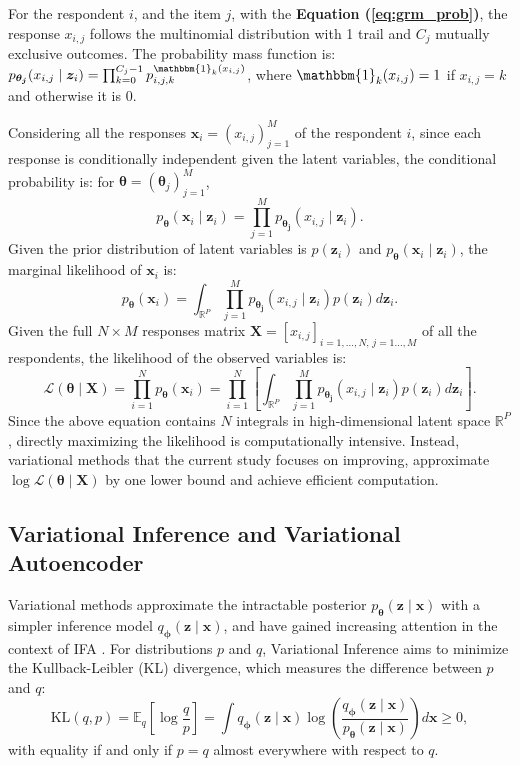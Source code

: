 \documentclass[a4paper,12pt]{article}
\theoremstyle{plain} %
\theoremstyle{remark} %
\theoremstyle{definition} %
\begin{document}
For the respondent $i$, and the item $j$, with the \textbf{Equation (\ref{eq:grm_prob})}, the response $x_{i,j}$ follows the multinomial distribution with 1 trail and $C_j$ mutually exclusive outcomes. The probability mass function is: $p_{\bm{\theta_j}}(x_{i,j} \mid \bm{z}_i)=\prod_{k=0}^{C_j-1}p_{i,j,k}^{\mathbbm{1}_k(x_{i,j})}$, where $\mathbbm{1}_k(x_{i,j})=1$ if $x_{i,j}=k$ and otherwise it is 0.

Considering all the responses $\bm{x}_i=(x_{i,j})_{j=1}^M$ of the respondent $i$, since each response is conditionally independent given the latent variables, the conditional probability is: for $\bm{\theta}=(\bm{\theta}_j)_{j=1}^M$,
\begin{equation}\label{eq:pmf_xi}
    p_{\bm{\theta}}(\bm{x}_i \mid \bm{z}_i)=\prod\limits_{j=1}^M p_{\bm{\theta_j}}(x_{i,j} \mid \bm{z}_i).
\end{equation}
Given the prior distribution of latent variables is $p(\bm{z}_i)$ and $p_{\bm{\theta}}(\bm{x}_i \mid \bm{z}_i)$, the marginal likelihood of $\bm{x}_i$ is:
\begin{equation}\label{eq:mpdf_zi}
    p_{\bm{\theta}}(\bm{x}_i)=\int_{\mathbb{R}^P}\prod\limits_{j=1}^M p_{\bm{\theta_j}}(x_{i,j} \mid \bm{z}_i)p(\bm{z}_i)d\bm{z}_i.
\end{equation}
Given the full $N\times M$ responses matrix $\bm{X}=[x_{i,j}]_{i=1,\dots,N,\,j=1\dots,M}$ of all the respondents, the likelihood of the observed variables is:
\begin{equation}\label{eq:ml_X}
    \mathcal{L}(\bm{\theta}\mid\bm{X})=\prod_{i=1}^N p_{\bm{\theta}}(\bm{x}_i)=\prod_{i=1}^N\left[\int_{\mathbb{R}^P}\prod\limits_{j=1}^M p_{\bm{\theta_j}}(x_{i,j} \mid \bm{z}_i)p(\bm{z}_i)d\bm{z}_i\right].
\end{equation}
Since the above equation contains $N$ integrals in high-dimensional latent space $\mathbb{R}^P$, directly maximizing the likelihood is computationally intensive. Instead, variational methods that the current study focuses on improving, approximate $\log \mathcal{L}(\bm{\theta}\mid\bm{X})$ by one lower bound and achieve efficient computation.

\subsection{Variational Inference and Variational Autoencoder}\label{sec:vae}
Variational methods approximate the intractable posterior $p_{\bm{\theta}}(\bm{z}\mid\bm{x})$ with a simpler inference model $q_{\bm{\phi}}(\bm{z}\mid\bm{x})$, and have gained increasing attention in the context of IFA \citep[e.g.,][]{cho2021gaussian, natesan2016bayesian, jeon2017variational, urban2021deep}. For distributions $p$ and $q$, Variational Inference aims to minimize the Kullback-Leibler (KL) divergence, which measures the difference between $p$ and $q$:
\begin{equation}
   {\text{KL}}\left(q , p\right) = \mathbb{E}_q\left [\log \frac{q}{p} \right] = \int q_{\bm{\phi}}(\bm{z}\mid\bm{x}) \log\left(\frac{q_{\bm{\phi}}(\bm{z}\mid\bm{x})}{p_{\bm{\theta}}(\bm{z}\mid\bm{x})}\right) d\bm{x} \geq 0, \label{eq:kl}
\end{equation}
with equality if and only if $p=q$ almost everywhere with respect to $q$.
\end{document}

